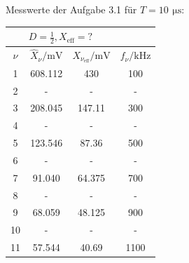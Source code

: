 \documentclass[a4paper, 12pt]{article}
\begin{document}
  \subsection{}
  \begin{center}
    Messwerte der Aufgabe 3.1 für \emph{$T=10 \,\ \si{\micro\second}$}:\\
    \vspace{0.021276873\paperheight}
    \bgroup
    \def\arraystretch{1.6180339887498948}
      \begin{tabular}{@{}cccc@{}}
      \toprule
      \multicolumn{3}{c}{$D = \frac{1}{2}, X_{\text{eff}}=?$} \\ \midrule
      $\nu$      & $\hat{X}_\nu / \si{\milli\volt}$   & $X_{\nu_{\text{eff}}} / \si{\milli\volt}$ & $f_\nu / \si{\kilo\hertz}$ \\ \hline
        1     & 608.112                          & 430                                     & 100                        \\
        2     & -                                & -                                       & -                          \\
        3     & 208.045                          & 147.11                                  & 300                        \\
        4     & -                                & -                                       & -                          \\
        5     & 123.546                          & 87.36                                   & 500                        \\
        6     & -                                & -                                       & -                          \\
        7     & 91.040                           & 64.375                                  & 700                        \\
        8     & -                                & -                                       & -                          \\
        9     & 68.059                           & 48.125                                  & 900                        \\
        10    & -                                & -                                       & -                          \\
        11    & 57.544                           & 40.69                                   & 1100                       \\

\end{tabular}
\end{center}
\end{document}
